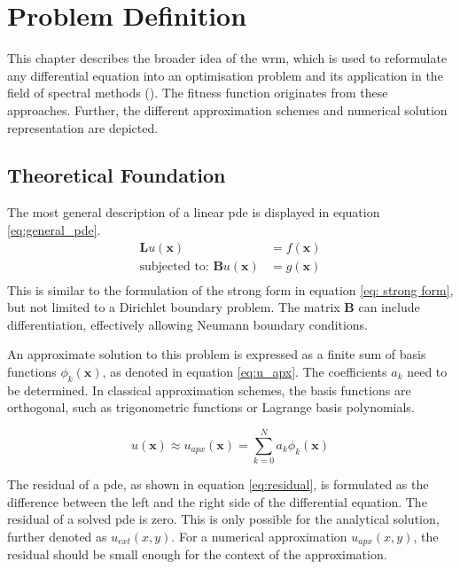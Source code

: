 \documentclass[./\jobname.tex]{subfiles}
\begin{document}
\chapter{Problem Definition}
This chapter describes the broader idea of the \gls{wrm}, which is used to reformulate any differential equation into an optimisation problem and its application in the field of spectral methods (\cite{shen_spectral_2011}). The fitness function originates from these approaches. Further, the different approximation schemes and numerical solution representation are depicted. 

\section{Theoretical Foundation}
\label{chap:opt_problem}

The most general description of a linear \gls{pde} is displayed in equation \eqref{eq:general_pde}.
\begin{equation}
\label{eq:general_pde}
\begin{split}
\mathbf{L}u(\mathbf{x}) & = f(\mathbf{x}) \\
\text{subjected to: }\mathbf{B}u(\mathbf{x}) & = g(\mathbf{x}) \\
\end{split}
\end{equation}
This is similar to the formulation of the strong form in equation \eqref{eq: strong form}, but not limited to a Dirichlet boundary problem. The matrix $\mathbf{B}$ can include differentiation, effectively allowing Neumann boundary conditions. 

An approximate solution to this problem is expressed as a finite sum of basis functions $\phi_k(\mathbf{x})$, as denoted in equation \eqref{eq:u_apx}. The coefficients $a_k$ need to be determined. In classical approximation schemes, the basis functions are orthogonal, such as trigonometric functions or Lagrange basis polynomials. 

\begin{equation}
\label{eq:u_apx}
u(\mathbf{x}) \approx u_{apx}(\mathbf{x}) = \sum_{k=0}^{N} a_k \phi_k (\mathbf{x})
\end{equation}

The residual of a \gls{pde}, as shown in equation \eqref{eq:residual}, is formulated as the difference between the left and the right side of the differential equation. The residual of a solved \gls{pde} is zero. This is only possible for the analytical solution, further denoted as $u_{ext}(x,y)$. For a numerical approximation $u_{apx}(x,y)$, the residual should be small enough for the context of the approximation. 
\end{document}
